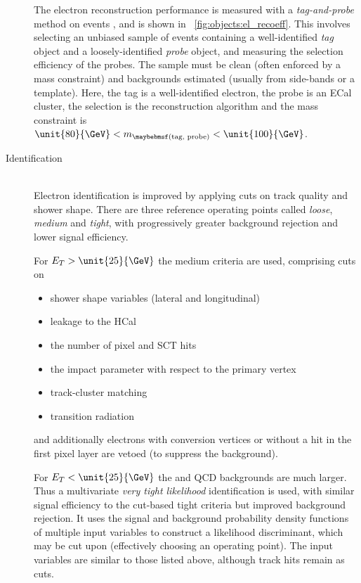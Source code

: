 \begin{description}
	The electron reconstruction performance is measured with a \textit{tag-and-probe} 
	method on \HepProcess{\PZ \HepTo \Pe\Pe} events \cite{ElectronPerf:2010,
	ElectronPerf:2012}, and is shown in \Figure~\ref{fig:objects:el_recoeff}. This 
	involves selecting an unbiased sample of events containing a well-identified 
	\textit{tag} object and a loosely-identified \textit{probe} object, and measuring the 
	selection efficiency of the probes. The sample must be clean (often enforced by a 
	mass constraint) and backgrounds estimated (usually from side-bands or a template).
	Here, the tag is a well-identified electron, the probe is an \ac{ECal} cluster, the 
	selection is the reconstruction algorithm and the mass constraint is 
	$\unit{80}{\GeV} < m_{\parenths{\text{tag, probe}}} < \unit{100}{\GeV}$.
\item[Identification] \hfill \\
	Electron identification is improved by applying cuts on track quality and shower 
	shape. There are three reference operating points called \textit{loose}, 
	\textit{medium} and \textit{tight}, with progressively greater background rejection 
	and lower signal efficiency.
	
	For $E_T > \unit{25}{\GeV}$ the medium criteria are used, comprising cuts on
	\begin{itemize}
		\item shower shape variables (lateral and longitudinal)
		\item leakage to the \ac{HCal}
		\item the number of pixel and \acs{SCT} hits
		\item the impact parameter with respect to the primary vertex
		\item track-cluster matching
		\item transition radiation
	\end{itemize}
	and additionally electrons with conversion vertices or without a hit in the first 
	pixel layer are vetoed (to suppress the \Wgamma background).
 
 	For $E_T < \unit{25}{\GeV}$ the \Wjets and QCD backgrounds are much larger. Thus a 
 	multivariate \textit{very tight likelihood} identification is used, with similar 
 	signal efficiency to the cut-based tight criteria but improved background rejection. 
 	It uses the signal and background probability density functions of multiple input 
 	variables to construct a likelihood discriminant, which may be cut upon (effectively 
 	choosing an operating point). The input variables are similar to those listed above, 
 	although track hits remain as cuts.
 

\end{description}
